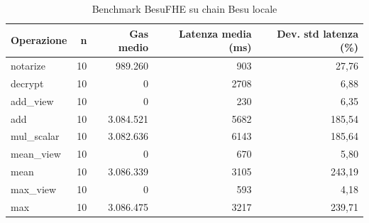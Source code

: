 \begin{table}[H]
\centering
\caption{Benchmark BesuFHE su chain Besu locale}
\label{tab:besufhe-local-benchmark}
\begin{tabular}{lrrrr}
\hline
\textbf{Operazione} & \textbf{n} & \textbf{Gas medio} & \textbf{Latenza media (ms)} & \textbf{Dev. std latenza (\%)} \\
\hline
notarize & 10 & 989.260 & 903 & 27,76 \\
decrypt & 10 & 0 & 2708 & 6,88 \\
add\_view & 10 & 0 & 230 & 6,35 \\
add & 10 & 3.084.521 & 5682 & 185,54 \\
mul\_scalar & 10 & 3.082.636 & 6143 & 185,64 \\
mean\_view & 10 & 0 & 670 & 5,80 \\
mean & 10 & 3.086.339 & 3105 & 243,19 \\
max\_view & 10 & 0 & 593 & 4,18 \\
max & 10 & 3.086.475 & 3217 & 239,71 \\
\hline
\end{tabular}
\end{table}
\vspace{4pt}

